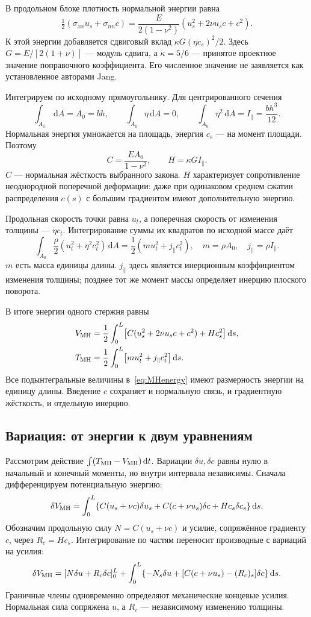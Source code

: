 \documentclass[11pt,a4paper]{article}
\newcommand{\dd}{\,\mathrm d}
\begin{document}
В продольном блоке плотность нормальной энергии равна
\[
\tfrac12(\sigma_{xx}u_s+\sigma_{nn}c)
=\frac{E}{2(1-\nu^2)}(u_s^2+2\nu u_sc+c^2).
\]
К этой энергии добавляется сдвиговый вклад $\kappa G(\eta c_s)^2/2$. Здесь $G=E/[2(1+\nu)]$ --- модуль сдвига, а $\kappa=5/6$ --- принятое проектное значение поправочного коэффициента. Его численное значение не заявляется как установленное авторами Jang.

Интегрируем по исходному прямоугольнику. Для центрированного сечения
\[
\int_{A_0}\dd A=A_0=bh,\qquad
\int_{A_0}\eta\dd A=0,\qquad
\int_{A_0}\eta^2\dd A=I_\parallel=\frac{bh^3}{12}.
\]
Нормальная энергия умножается на площадь, энергия $c_s$ --- на момент площади. Поэтому
\[
C=\frac{EA_0}{1-\nu^2},\qquad H=\kappa G I_\parallel.
\]
$C$ --- нормальная жёсткость выбранного закона. $H$ характеризует сопротивление неоднородной поперечной деформации: даже при одинаковом среднем сжатии распределения $c(s)$ с большим градиентом имеют дополнительную энергию.

Продольная скорость точки равна $u_t$, а поперечная скорость от изменения толщины --- $\eta c_t$. Интегрирование суммы их квадратов по исходной массе даёт
\[
\int_{A_0}\frac{\rho}{2}(u_t^2+\eta^2c_t^2)\dd A
=\frac12(mu_t^2+j_\parallel c_t^2),
\quad m=\rho A_0,\quad j_\parallel=\rho I_\parallel.
\]
$m$ есть масса единицы длины. $j_\parallel$ здесь является инерционным коэффициентом изменения толщины; позднее тот же момент массы определяет инерцию плоского поворота.

В итоге энергии одного стержня равны
\begin{equation}
\begin{aligned}
V_{\rm MH}&=\frac12\int_0^L
\bigl[C(u_s^2+2\nu u_sc+c^2)+Hc_s^2\bigr]\dd s,\\
T_{\rm MH}&=\frac12\int_0^L
\bigl[mu_t^2+j_\parallel c_t^2\bigr]\dd s.
\end{aligned}
\label{eq:MHenergy}
\end{equation}
Все подынтегральные величины в~\eqref{eq:MHenergy} имеют размерность энергии на единицу длины. Введение $c$ сохраняет и нормальную связь, и градиентную жёсткость, и отдельную инерцию.

\subsection{Вариация: от энергии к двум уравнениям}
Рассмотрим действие $\int(T_{\rm MH}-V_{\rm MH})\dd t$. Вариации $\delta u,\delta c$ равны нулю в начальный и конечный моменты, но внутри интервала независимы. Сначала дифференцируем потенциальную энергию:
\[
\delta V_{\rm MH}=\int_0^L
\{C(u_s+\nu c)\delta u_s+C(c+\nu u_s)\delta c
+Hc_s\delta c_s\}\dd s.
\]
Обозначим продольную силу $N=C(u_s+\nu c)$ и усилие, сопряжённое градиенту $c$, через $R_c=Hc_s$. Интегрирование по частям переносит производные с вариаций на усилия:
\[
\delta V_{\rm MH}=[N\delta u+R_c\delta c]_0^L
+\int_0^L\{-N_s\delta u+[C(c+\nu u_s)-(R_c)_s]\delta c\}\dd s.
\]
Граничные члены одновременно определяют механические концевые усилия. Нормальная сила сопряжена $u$, а $R_c$ --- независимому изменению толщины.
\end{document}
